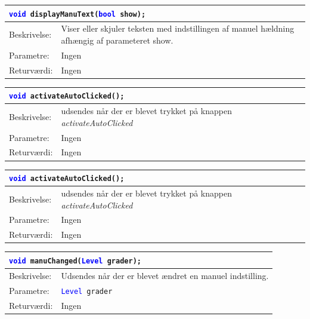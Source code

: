\begin{table}[H]
\begin{tabular}{l p{12.5cm}}
\multicolumn{2}{l}{\texttt{\textcolor{blue}{void} displayManuText(\textcolor{blue}{bool} show);}} \\
\hline
Beskrivelse:&Viser eller skjuler teksten med indstillingen af manuel hældning afhængig af parameteret show.\\    
Parametre:&Ingen\\
Returværdi:&Ingen\\
\end{tabular}
\end{table}



\begin{table}[H]
\begin{tabular}{l p{12.5cm}}
\multicolumn{2}{l}{\texttt{\textcolor{blue}{void} activateAutoClicked();}} \\
\hline
Beskrivelse:& udsendes når der er blevet trykket på knappen \textit{activateAutoClicked}\\
Parametre:&Ingen\\
Returværdi:&Ingen\\
\end{tabular}
\end{table}


\begin{table}[H]
\begin{tabular}{l p{12.5cm}}
\multicolumn{2}{l}{\texttt{\textcolor{blue}{void} activateAutoClicked();}} \\
\hline
Beskrivelse:& udsendes når der er blevet trykket på knappen \textit{activateAutoClicked}\\
Parametre:&Ingen\\
Returværdi:&Ingen\\
\end{tabular}
\end{table}


\begin{table}[H]
\begin{tabular}{l p{12.5cm}}
\multicolumn{2}{l}{\texttt{\textcolor{blue}{void} manuChanged(\textcolor{blue}{Level} grader);}} \\
\hline
Beskrivelse:&Udsendes når der er blevet ændret en manuel indstilling.\\
Parametre:&\texttt{\textcolor{blue}{Level} grader}\\
Returværdi:&Ingen\\
\end{tabular}
\end{table}


